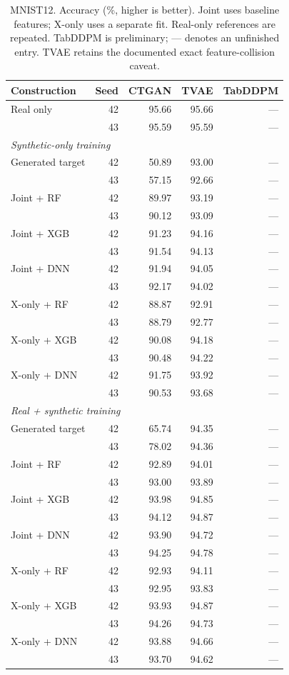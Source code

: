 \begin{table}[ht]
\centering
{\small
\setlength{\tabcolsep}{2pt}
\begin{tabular}{lrrrr}
\toprule
Construction & Seed & CTGAN & TVAE & TabDDPM \\
\midrule
Real only & 42 & 95.66 & 95.66 & --- \\
 & 43 & 95.59 & 95.59 & --- \\
\midrule
\multicolumn{5}{l}{\textit{Synthetic-only training}} \\
Generated target & 42 & 50.89 & 93.00 & --- \\
 & 43 & 57.15 & 92.66 & --- \\
Joint + RF & 42 & 89.97 & 93.19 & --- \\
 & 43 & 90.12 & 93.09 & --- \\
Joint + XGB & 42 & 91.23 & 94.16 & --- \\
 & 43 & 91.54 & 94.13 & --- \\
Joint + DNN & 42 & 91.94 & 94.05 & --- \\
 & 43 & 92.17 & 94.02 & --- \\
X-only + RF & 42 & 88.87 & 92.91 & --- \\
 & 43 & 88.79 & 92.77 & --- \\
X-only + XGB & 42 & 90.08 & 94.18 & --- \\
 & 43 & 90.48 & 94.22 & --- \\
X-only + DNN & 42 & 91.75 & 93.92 & --- \\
 & 43 & 90.53 & 93.68 & --- \\
\midrule
\multicolumn{5}{l}{\textit{Real + synthetic training}} \\
Generated target & 42 & 65.74 & 94.35 & --- \\
 & 43 & 78.02 & 94.36 & --- \\
Joint + RF & 42 & 92.89 & 94.01 & --- \\
 & 43 & 93.00 & 93.89 & --- \\
Joint + XGB & 42 & 93.98 & 94.85 & --- \\
 & 43 & 94.12 & 94.87 & --- \\
Joint + DNN & 42 & 93.90 & 94.72 & --- \\
 & 43 & 94.25 & 94.78 & --- \\
X-only + RF & 42 & 92.93 & 94.11 & --- \\
 & 43 & 92.95 & 93.83 & --- \\
X-only + XGB & 42 & 93.93 & 94.87 & --- \\
 & 43 & 94.26 & 94.73 & --- \\
X-only + DNN & 42 & 93.88 & 94.66 & --- \\
 & 43 & 93.70 & 94.62 & --- \\
\bottomrule
\end{tabular}
}
\caption{MNIST12. Accuracy (\%, higher is better). Joint uses baseline features; X-only uses a separate fit. Real-only references are repeated. TabDDPM is preliminary; --- denotes an unfinished entry. TVAE retains the documented exact feature-collision caveat.}
\label{tab:mnist12}
\end{table}
